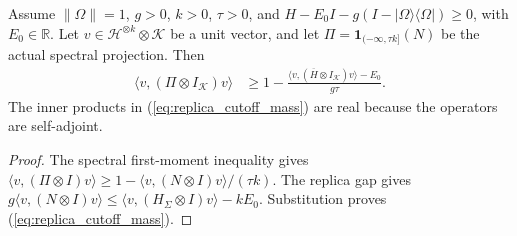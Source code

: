 \begin{theorem}
\label{thm:replica_cutoff_mass}
\leanok
{}
Assume $\|\Omega\|=1$, $g>0$, $k>0$, $\tau>0$, and
$H-E_0I-g(I-|\Omega\rangle\langle\Omega|)\ge0$, with $E_0\in\mathbb R$.
Let $v\in\mathcal H^{\otimes k}\otimes\mathcal K$ be a unit vector, and
let $\Pi=\mathbf1_{(-\infty,\tau k]}(N)$ be the actual spectral projection.
Then
\begin{align}
 \langle v,(\Pi\otimes I_{\mathcal K})v\rangle
 &\ge 1-\frac{\langle v,(\overline H\otimes I_{\mathcal K})v\rangle-E_0}
                  {g\tau}.
 \label{eq:replica_cutoff_mass}
\end{align}
The inner products in (\ref{eq:replica_cutoff_mass}) are real because the
operators are self-adjoint.
\end{theorem}
\begin{proof}
\leanok
{}
The spectral first-moment inequality gives
$\langle v,(\Pi\otimes I)v\rangle\ge
1-\langle v,(N\otimes I)v\rangle/(\tau k)$.
The replica gap gives
$g\langle v,(N\otimes I)v\rangle
\le\langle v,(H_\Sigma\otimes I)v\rangle-kE_0$.
Substitution proves (\ref{eq:replica_cutoff_mass}).
\end{proof}
